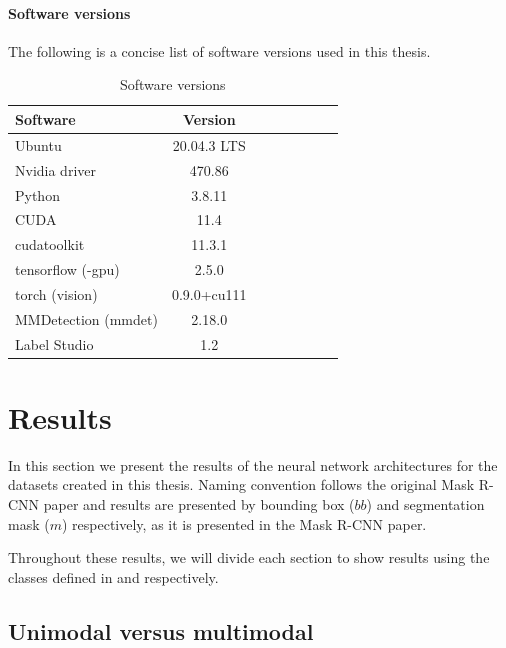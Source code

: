 \documentclass[oneside, english, bibtex]{kththesis}
\begin{document}
\subsubsection{Software versions}

The following is a concise list of software versions used in this thesis.

\begin{table}[!ht]
  \begin{center}
    \caption{Software versions}
        \begin{tabular}{l*{6}{c}r}
        \label{tab:softwareversions}
        \textbf{Software} & \textbf{Version} \\
        \hline
        Ubuntu & 20.04.3 LTS & \\
        Nvidia driver     & 470.86 & \\
        Python           & 3.8.11 & \\
        CUDA     & 11.4 & \\
        cudatoolkit     & 11.3.1 & \\
        tensorflow (-gpu)     & 2.5.0 & \\
        torch (vision)     & 0.9.0+cu111 & \\
        MMDetection (mmdet)     & 2.18.0 & \\
        Label Studio     & 1.2 & \\
        \end{tabular}
  \end{center}
\end{table}


\chapter{Results}
\label{ch:results}

In this section we present the results of the neural network architectures for the datasets created in this thesis. Naming convention follows the original Mask R-CNN paper and results are presented by bounding box ($bb$) and segmentation mask ($m$) respectively, as it is presented in the Mask R-CNN paper.

Throughout these results, we will divide each section to show results using the classes defined in  and  respectively.

\section{Unimodal versus multimodal}
\end{document}
